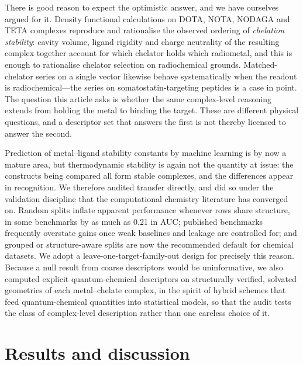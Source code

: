 \documentclass[twoside,twocolumn,9pt]{article}
\begin{document}
There is good reason to expect the optimistic answer, and we have ourselves argued for it. Density functional calculations on DOTA, NOTA, NODAGA and TETA complexes reproduce and rationalise the observed ordering of \emph{chelation stability}: cavity volume, ligand rigidity and charge neutrality of the resulting complex together account for which chelator holds which radiometal, and this is enough to rationalise chelator selection on radiochemical grounds.\cite{Kim2026ChelatorDFT} Matched-chelator series on a single vector likewise behave systematically when the readout is radiochemical---the  series on somatostatin-targeting peptides is a case in point.\cite{Kim2026PbSSTR2} The question this article asks is whether the same complex-level reasoning extends from holding the metal to binding the target. These are different physical questions, and a descriptor set that answers the first is not thereby licensed to answer the second.

Prediction of metal--ligand stability constants by machine learning is by now a mature area, but thermodynamic stability is again not the quantity at issue: the constructs being compared all form stable complexes, and the differences appear in recognition. We therefore audited transfer directly, and did so under the validation discipline that the computational chemistry literature has converged on. Random splits inflate apparent performance whenever rows share structure, in some benchmarks by as much as 0.21 in AUC;\cite{Kim2026TAS2R} published benchmarks frequently overstate gains once weak baselines and leakage are controlled for;\cite{McGreivy2024Weak,Schuh2026Audit} and grouped or structure-aware splits are now the recommended default for chemical datasets.\cite{Boldini2025UMAP,Tropsha2025Eval} We adopt a leave-one-target-family-out design for precisely this reason. Because a null result from coarse descriptors would be uninformative, we also computed explicit quantum-chemical descriptors on structurally verified, solvated geometries of each metal--chelate complex, in the spirit of hybrid schemes that feed quantum-chemical quantities into statistical models,\cite{Kang2025QSAR} so that the audit tests the class of complex-level description rather than one careless choice of it.

\section{Results and discussion}
\end{document}
